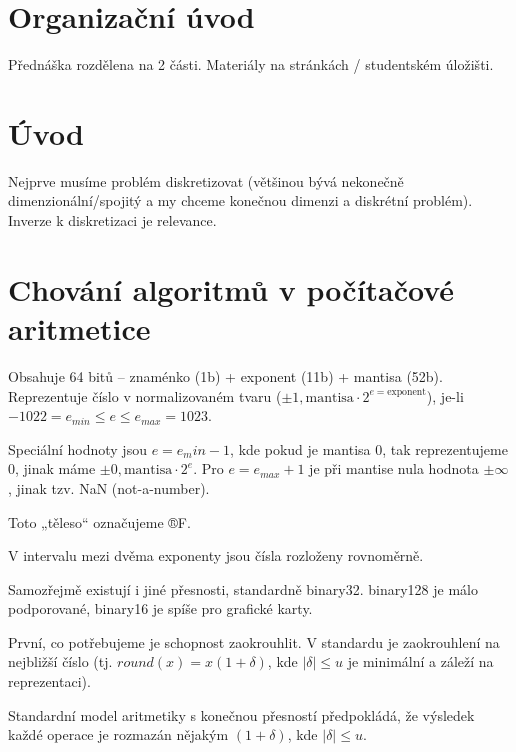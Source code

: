 \documentclass[12pt]{article}					%
\begin{document}

\section*{Organizační úvod}
\begin{poznamka}
	Přednáška rozdělena na 2 části. Materiály na stránkách / studentském úložišti.
\end{poznamka}

\section*{Úvod}
\begin{poznamka}
	Nejprve musíme problém diskretizovat (většinou bývá nekonečně dimenzionální/spojitý a my chceme konečnou dimenzi a diskrétní problém). Inverze k diskretizaci je relevance.
\end{poznamka}

\section{Chování algoritmů v počítačové aritmetice}
\begin{definice}
	Obsahuje 64 bitů – znaménko (1b) + exponent (11b) + mantisa (52b). Reprezentuje číslo v normalizovaném tvaru ($±1,\text{mantisa}·2^{e = \text{exponent}}$), je-li $-1022 = e_{min} ≤ e ≤ e_{max} = 1023$.

	Speciální hodnoty jsou $e = e_min - 1$, kde pokud je mantisa $0$, tak reprezentujeme $0$, jinak máme $±0,\text{mantisa}·2^e$. Pro $e = e_{max} + 1$ je při mantise nula hodnota $±∞$, jinak tzv. NaN (not-a-number).

	Toto „těleso“ označujeme ®F.

	\begin{poznamkain}
		V intervalu mezi dvěma exponenty jsou čísla rozloženy rovnoměrně.
	\end{poznamkain}

	\begin{poznamkain}
		Samozřejmě existují i jiné přesnosti, standardně binary32. binary128 je málo podporované, binary16 je spíše pro grafické karty.
	\end{poznamkain}
\end{definice}	

\begin{definice}[Operace s ®F]
	První, co potřebujeme je schopnost zaokrouhlit. V standardu je zaokrouhlení na nejbližší číslo (tj. $round(x) = x(1 + \delta)$, kde $|\delta| ≤ u$ je minimální a záleží na reprezentaci).

	Standardní model aritmetiky s konečnou přesností předpokládá, že výsledek každé operace je rozmazán nějakým $(1 + \delta)$, kde $|\delta| ≤ u$.
\end{definice}
\end{document}
